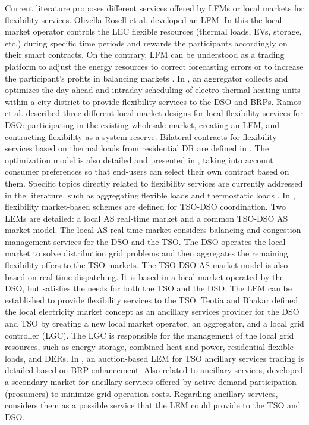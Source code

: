 Current literature proposes different services offered by LFMs or local markets for flexibility services. Olivella-Rosell et al. \cite{Olivella2018} developed an LFM. In this the local market operator controls the LEC flexible resources (thermal loads, EVs, storage, etc.) during specific time periods and rewards the participants accordingly on their smart contracts. On the contrary, LFM can be understood as a trading platform to adjust the energy resources to correct forecasting errors or to increase the participant's profits in balancing markets \cite{ilieva2016design}. In \cite{diekerhof2017hierarchical}, an aggregator collects and optimizes the day-ahead and intraday scheduling of electro-thermal heating units within a city district to provide flexibility services to the DSO and BRPs. Ramos et al. \cite{ramos2016realizing} described three different local market designs for local flexibility services for DSO: participating in the existing wholesale market, creating an LFM, and contracting flexibility as a system reserve. Bilateral contracts for flexibility services based on thermal loads from residential DR are defined in \cite{boscan2016flexibility}. The optimization model is also detailed and presented in \cite{boscan2016flexibility}, taking into account consumer preferences so that end-users can select their own contract based on them. Specific topics directly related to flexibility services are currently addressed in the literature, such as aggregating flexible loads \cite{nayyar2013aggregate, pandvzic2013offering} and thermostatic loads \cite{alahaivala2017control}.
In \cite{leclercq2019network}, flexibility market-based schemes are defined for TSO-DSO coordination. Two LEMs are detailed: a local AS real-time market and a common TSO-DSO AS market model. The local AS real-time market considers balancing and congestion management services for the DSO and the TSO. The DSO operates the local market to solve distribution grid problems and then aggregates the remaining flexibility offers to the TSO markets. 
The TSO-DSO AS market model is also based on real-time dispatching. It is based in a local market operated by the DSO, but satisfies the needs for both the TSO and the DSO. The LFM can be established to provide flexibility services to the TSO. Teotia and Bhakar \cite{teotia2016local} defined the local electricity market concept as an ancillary services provider for the DSO and TSO by creating a new local market operator, an aggregator, and a local grid controller (LGC). The LGC is responsible for the management of the local grid resources, such as energy storage, combined heat and power, residential flexible loads, and DERs. In \cite{rosen2013auction}, an auction-based LEM for TSO ancillary services trading is detailed based on BRP enhancement. Also related to ancillary services, \cite{martinez2013active} developed a secondary market for ancillary services offered by active demand participation (prosumers) to minimize grid operation costs. Regarding ancillary services, \cite{menniti2014future} considers them as a possible service that the LEM could provide to the TSO and DSO.
